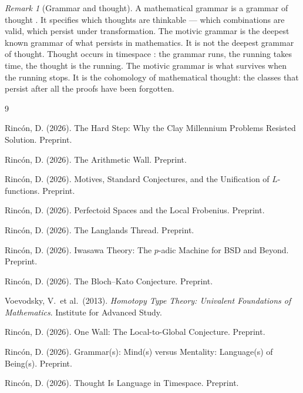 \documentclass[12pt]{article}
\theoremstyle{definition}
\theoremstyle{remark}
\newtheorem{remark}[theorem]{Remark}
\begin{document}
\begin{remark}[Grammar and thought]
A mathematical grammar is a grammar of thought \cite{grammars}.
It specifies which thoughts are thinkable ---
which combinations are valid, which persist under transformation.
The motivic grammar is the deepest known grammar of what persists in mathematics.
It is not the deepest grammar of thought.
Thought occurs in timespace \cite{timespace}:
the grammar runs, the running takes time,
the thought is the running.
The motivic grammar is what survives when the running stops.
It is the cohomology of mathematical thought:
the classes that persist after all the proofs have been forgotten.
\end{remark}

\begin{thebibliography}{9}

Rinc\'on, D. (2026).
The Hard Step: Why the Clay Millennium Problems Resisted Solution. Preprint.

Rinc\'on, D. (2026).
The Arithmetic Wall. Preprint.

Rinc\'on, D. (2026).
Motives, Standard Conjectures, and the Unification of $L$-functions. Preprint.

Rinc\'on, D. (2026).
Perfectoid Spaces and the Local Frobenius. Preprint.

Rinc\'on, D. (2026).
The Langlands Thread. Preprint.

Rinc\'on, D. (2026).
Iwasawa Theory: The $p$-adic Machine for BSD and Beyond. Preprint.

Rinc\'on, D. (2026).
The Bloch--Kato Conjecture. Preprint.

Voevodsky, V.\ et al.\ (2013).
\textit{Homotopy Type Theory: Univalent Foundations of Mathematics}.
Institute for Advanced Study.

Rinc\'on, D. (2026).
One Wall: The Local-to-Global Conjecture. Preprint.

Rinc\'on, D. (2026).
Grammar(s): Mind(s) versus Mentality: Language(s) of Being(s). Preprint.

Rinc\'on, D. (2026).
Thought Is Language in Timespace. Preprint.

\end{thebibliography}
\end{document}
